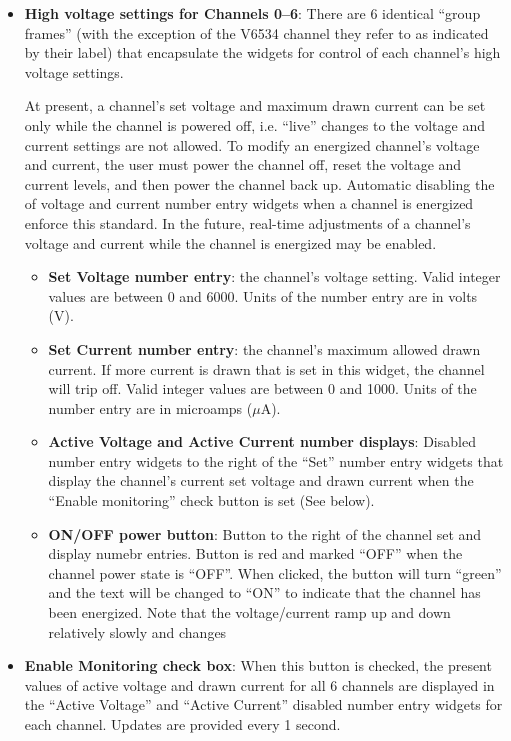 \begin{itemize}
\item{\textbf{High voltage settings for Channels 0--6}: There are 6
  identical ``group frames'' (with the exception of the V6534 channel
  they refer to as indicated by their label) that encapsulate the
  widgets for control of each channel's high voltage settings. 

  At present, a channel's set voltage and maximum drawn current can be
  set only while the channel is powered off, i.e. ``live'' changes to
  the voltage and current settings are not allowed. To modify an
  energized channel's voltage and current, the user must power the
  channel off, reset the voltage and current levels, and then power
  the channel back up. Automatic disabling the of voltage and current
  number entry widgets when a channel is energized enforce this
  standard. In the future, real-time adjustments of a channel's
  voltage and current while the channel is energized may be enabled.
    \begin{itemize}
    \item{\textbf{Set Voltage number entry}: the channel's voltage
        setting. Valid integer values are between 0 and 6000. Units of
        the number entry are in volts (V).}
    \item{\textbf{Set Current number entry}: the channel's maximum
        allowed drawn current. If more current is drawn that is set in
        this widget, the channel will trip off. Valid integer values
        are between 0 and 1000. Units of the number entry are in
        microamps ($\mu$A).}
    \item{\textbf{Active Voltage and Active Current number displays}:
        Disabled number entry widgets to the right of the ``Set''
        number entry widgets that display the channel's current set
        voltage and drawn current when the ``Enable monitoring'' check
        button is set (See below).}
    \item{\textbf{ON/OFF power button}: Button to the right of the
      channel set and display numebr entries. Button is red and marked
      ``OFF'' when the channel power state is ``OFF''. When clicked,
      the button will turn ``green'' and the text will be changed to
      ``ON'' to indicate that the channel has been energized. Note
      that the voltage/current ramp up and down relatively slowly and
      changes }
    \end{itemize}
  }
\item{\textbf{Enable Monitoring check box}: When this button is
    checked, the present values of active voltage and drawn current
    for all 6 channels are displayed in the ``Active Voltage'' and
    ``Active Current'' disabled number entry widgets for each
    channel. Updates are provided every 1 second.}
\end{itemize}

